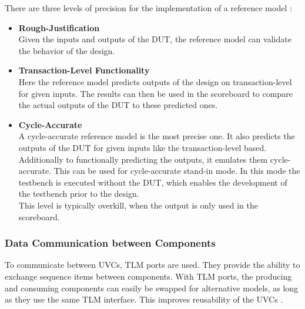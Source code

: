 There are three levels of precision for the implementation of a reference model \cite{uvm}:

\begin{itemize}
  \item \textbf{Rough-Justification}\\
  Given the inputs and outputs of the DUT, the reference model can validate the behavior of the design.
  \item \textbf{Transaction-Level Functionality}\\
  Here the reference model predicts outputs of the design on transaction-level for given inputs.
  The results can then be used in the scoreboard to compare the actual outputs of the DUT to these predicted ones. 
  \item \textbf{Cycle-Accurate}\\
  A cycle-accurate reference model is the most precise one. 
  It also predicts the outputs of the DUT for given inputs like the transaction-level based.
  Additionally to functionally predicting the outputs, it emulates them cycle-accurate.
  This can be used for cycle-accurate stand-in mode.
  In this mode the testbench is executed without the DUT, which enables the development of the testbench prior to the design.\\
  This level is typically overkill, when the output is only used in the scoreboard.
\end{itemize}

\subsubsection{Data Communication between Components}\label{tlm}

To communicate between UVCs, TLM ports are used.
They provide the ability to exchange sequence items between components.
With TLM ports, the producing and consuming components can easily be swapped for alternative models, as long as they use the same TLM interface.
This improves reusability of the UVCs \cite{uvm_sv}.

